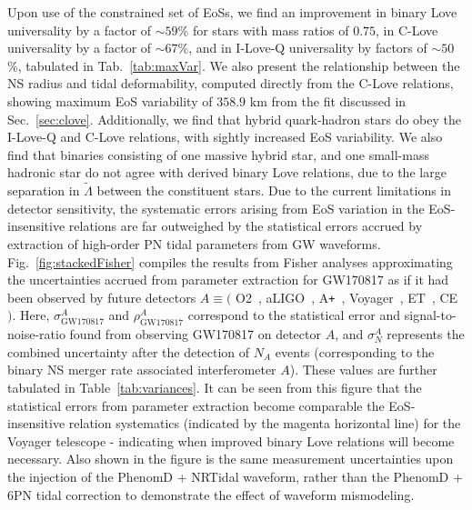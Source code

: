\documentclass[prd,twocolumn,nofootinbib,superscriptaddress,amsmath,amssymb]{revtex4-1}
\begin{document}
Upon use of the constrained set of EoSs, we find an improvement in binary Love universality by a factor of $\sim 59$\% for stars with mass ratios of $0.75$, in C-Love universality by a factor of $\sim 67\%$, and in I-Love-Q universality by factors of $\sim50$\%, tabulated in Tab.~\ref{tab:maxVar}.
We also present the relationship between the NS radius and tidal deformability, computed directly from the C-Love relations, showing maximum EoS variability of $358.9 \text{ km}$ from the fit discussed in Sec.~\ref{sec:clove}.
Additionally, we find that hybrid quark-hadron stars do obey the I-Love-Q and C-Love relations, with sightly increased EoS variability.
We also find that binaries consisting of one massive hybrid star, and one small-mass hadronic star do not agree with derived binary Love relations, due to the large separation in $\tilde{\Lambda}$ between the constituent stars.
Due to the current limitations in detector sensitivity, the systematic errors arising from EoS variation in the EoS-insensitive relations are far outweighed by the statistical errors accrued by extraction of high-order PN tidal parameters from GW waveforms.
Fig.~\ref{fig:stackedFisher} compiles the results from Fisher analyses approximating the uncertainties accrued from parameter extraction for GW170817 as if it had been observed by future detectors $A \equiv ($ O2~\cite{aLIGO}, aLIGO~\cite{aLIGO}, A\texttt{+}~\cite{Ap_Voyager_CE}, Voyager~\cite{Ap_Voyager_CE}, ET~\cite{ET}, CE~\cite{Ap_Voyager_CE}$)$.
Here, $\sigma^A_{\text{GW170817}}$ and $\rho^A_{\text{GW170817}}$ correspond to the statistical error and signal-to-noise-ratio found from observing GW170817 on detector $A$, and $\sigma^A_N$ represents the combined uncertainty after the detection of $N_A$ events (corresponding to the binary NS merger rate associated interferometer $A$).
These values are further tabulated in Table~\ref{tab:variances}.
It can be seen from this figure that the statistical errors from parameter extraction become comparable the EoS-insensitive relation systematics (indicated by the magenta horizontal line) for the Voyager telescope - indicating when improved binary Love relations will become necessary.
Also shown in the figure is the same measurement uncertainties upon the injection of the PhenomD + NRTidal waveform, rather than the PhenomD + 6PN tidal correction to demonstrate the effect of waveform mismodeling.
\end{document}
